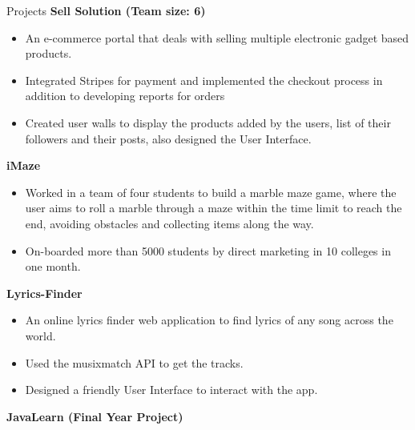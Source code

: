 \documentclass{resume} %
\begin{document}
\begin{rSection}{Projects}
{\bf Sell Solution (Team size: 6)}
    
    \begin{itemize}
        \vspace{-0.3cm}\item An e-commerce portal that deals with selling multiple electronic gadget based products.
        \vspace{-0.3cm}\item Integrated Stripes for payment and implemented the checkout process in addition to developing reports for orders
        \vspace{-0.3cm}\item Created user walls to display the products added by the users, list of their followers and their posts, also designed the User Interface.
    \end{itemize}

{\bf iMaze}
    \begin{itemize}
        \vspace{-0.3cm}\item Worked in a team of four students to build a marble maze game, where the user aims to roll a marble through a maze within the time limit to reach the end, avoiding obstacles and collecting items along the way.
        \vspace{-0.3cm}\item On-boarded more than 5000 students by direct marketing in 10 colleges in one month.
    \end{itemize}
 
 {\bf Lyrics-Finder}
    \begin{itemize}
        \vspace{-0.3cm}\item An online lyrics finder web application to find lyrics of any song across the world.
        \vspace{-0.3cm}\item Used the musixmatch API to get the tracks.
        \vspace{-0.3cm}\item Designed a friendly User Interface to interact with the app.
    \end{itemize}
    
 {\bf JavaLearn (Final Year Project)}
    

\end{rSection}
\end{document}

